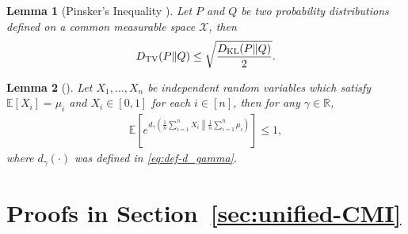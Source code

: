 \documentclass[onecolumn,romanappendices,10pt]{IEEEtran}
\newtheorem{lemma}{Lemma}
\newcommand{\Xcal}{{\mathcal X}}
\newcommand{\EE}{{\mathbb{E}}}
\newcommand{\RR}{{\mathbb{R}}}
\begin{document}
	\begin{lemma}[Pinsker’s Inequality {\cite[Theorem~7.10]{polyanskiy2025information}}]\label{lem:Pinsker-inequality}
		Let $P$ and $Q$ be two probability distributions defined on a common measurable space $\Xcal$, then
		\begin{align}
			D_{\textnormal{TV}} (P \| Q) \leq \sqrt{\frac{D_{\textnormal{KL}} (P \| Q)}{2}}.
		\end{align}
	\end{lemma}
	
	\begin{lemma}[{\cite[Lemma~2]{hellstrom2022new}}]\label{lem:binary-relative-entropy-concentration}
		Let $X_1, \ldots, X_n$ be independent random variables which satisfy $\EE[X_i] = \mu_i$ and $X_i \in [0,1]$ for each $i \in [n]$, then for any $\gamma \in \RR$,
		\begin{align}
			\EE \left[ e^{d_\gamma\left(\left. \frac{1}{n} \sum_{i=1}^{n} X_i \right\| \frac{1}{n} \sum_{i=1}^{n} \mu_i \right)} \right] \leq 1,
		\end{align}
		where $d_\gamma(\cdot)$ was defined in \eqref{eq:def-d_gamma}.
	\end{lemma}
	
	
	\section{Proofs in Section~\ref{sec:unified-CMI}} \label{app:proof-unified-CMI}
\end{document}
